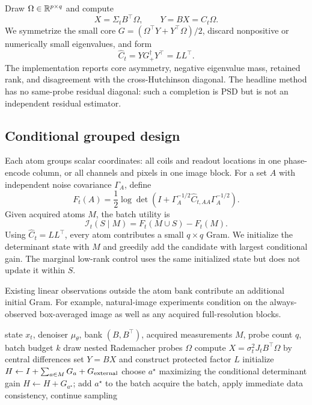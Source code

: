 Draw $\Omega\in\mathbb{R}^{p\times q}$ and compute
\begin{equation}
 X=\Sigma_tB^\top\Omega,\qquad Y=BX=C_t\Omega.
\end{equation}
We symmetrize the small core
$G=(\Omega^\top Y+Y^\top\Omega)/2$, discard nonpositive or numerically small
eigenvalues, and form
\begin{equation}
 \widehat C_t=Y G_+^\dagger Y^\top=LL^\top.
\end{equation}
The implementation reports core asymmetry, negative eigenvalue mass, retained
rank, and disagreement with the cross-Hutchinson diagonal.  The headline
method has no same-probe residual diagonal: such a completion is PSD but is
not an independent residual estimator.

\subsection{Conditional grouped design}

Each atom groups scalar coordinates: all coils and readout locations in one
phase-encode column, or all channels and pixels in one image block.  For a set
$A$ with independent noise covariance $\Gamma_A$, define
\begin{equation}
 F_t(A)=\frac12\log\det\left(
 I+\Gamma_A^{-1/2}\widehat C_{t,AA}\Gamma_A^{-1/2}
 \right).
\end{equation}
Given acquired atoms $M$, the batch utility is
\begin{equation}
 \mathcal{I}_t(S\mid M)=F_t(M\cup S)-F_t(M).
\end{equation}
Using $\widehat C_t=LL^\top$, every atom contributes a small $q\times q$
Gram.  We initialize the determinant state with $M$ and greedily add the
candidate with largest conditional gain.  The marginal low-rank control uses
the same initialized state but does not update it within $S$.

Existing linear observations outside the atom bank contribute an additional
initial Gram.  For example, natural-image experiments condition on the
always-observed box-averaged image as well as any acquired full-resolution
blocks.

\begin{algorithm}[t]
\caption{\method{} acquisition at one reverse step}
\label{alg:sketchsense}
\begin{algorithmic}[1]
\Require state $x_t$, denoiser $\mu_\theta$, bank $(B,B^\top)$, acquired
measurements $M$, probe count $q$, batch budget $k$
\State draw nested Rademacher probes $\Omega$
\State compute $X=\sigma_t^2J_tB^\top\Omega$ by central differences
\State set $Y=BX$ and construct protected factor $L$
\State initialize $H\gets I+\sum_{a\in M}G_a+G_{\rm external}$
  \State choose $a^\star$ maximizing the conditional determinant gain
  \State $H\gets H+G_{a^\star}$; add $a^\star$ to the batch
\EndFor
\State acquire the batch, apply immediate data consistency, continue sampling
\end{algorithmic}
\end{algorithm}
